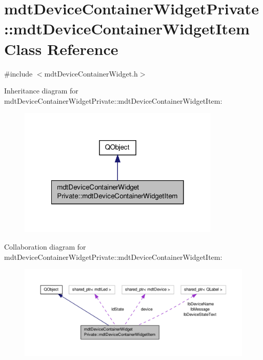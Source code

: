 \hypertarget{classmdt_device_container_widget_private_1_1mdt_device_container_widget_item}{\section{mdt\-Device\-Container\-Widget\-Private\-:\-:mdt\-Device\-Container\-Widget\-Item Class Reference}
\label{classmdt_device_container_widget_private_1_1mdt_device_container_widget_item}
}


{\ttfamily \#include $<$mdt\-Device\-Container\-Widget.\-h$>$}



Inheritance diagram for mdt\-Device\-Container\-Widget\-Private\-:\-:mdt\-Device\-Container\-Widget\-Item\-:\nopagebreak
\begin{figure}[H]
\begin{center}
\leavevmode
\includegraphics[width=272pt]{classmdt_device_container_widget_private_1_1mdt_device_container_widget_item__inherit__graph}
\end{center}
\end{figure}


Collaboration diagram for mdt\-Device\-Container\-Widget\-Private\-:\-:mdt\-Device\-Container\-Widget\-Item\-:\nopagebreak
\begin{figure}[H]
\begin{center}
\leavevmode
\includegraphics[width=350pt]{classmdt_device_container_widget_private_1_1mdt_device_container_widget_item__coll__graph}
\end{center}
\end{figure}
